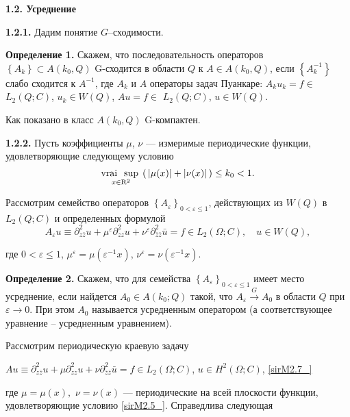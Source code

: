 \textbf{1.2.  Усреднение}

\textbf{1.2.1. }Дадим понятие $G$--сходимости.

\textbf{Определение 1.} Скажем, что  последовательность операторов $\left\{A_{k} \right\}\subset A(k_{0} ,Q)$ G-сходится в области $Q$ к $A\in A(k_{0} ,Q)$, если $\left\{A_{k}^{-1} \right\}$ слабо сходится к $A^{-1} $, где $A_{k} $ и $A$ операторы задач Пуанкаре:  $A_{k} u_{k} =f\in $$L_{2} (Q;C)$, $u_{k} \in W(Q)$, $Au=f\in $ $L_{2} (Q;C)$, $u\in W(Q)$.



Как показано в \cite{JikovKozlov}  класс  $A(k_{0} ,Q)$ G-компактен.

\textbf{1.2.2.} Пусть коэффициенты $\mu $, $\nu $ --- измеримые периодические функции, удовлетворяющие следующему условию
\begin{equation}
\label{sirM2.5_}
\mathop{\mathrm{ vrai}\, {\kern 1pt} \; \sup {\kern 1pt} }\limits_{x\in \mathrm{ R}^{2} } \left(\, \left|\mu (x)\right|+\left|\nu (x)\right|\, \right)\le k_{0} <1.
\end{equation}

Рассмотрим семейство операторов $\left\{A_{\varepsilon } \right\}_{0<\varepsilon \le 1} $, действующих из $W(Q)$ в $L_{2} (Q;C)$ и определенных формулой
\begin{equation}
\label{sirM2.6_}
A_{\varepsilon } u\equiv \partial _{z\bar{z}}^{2} u+\mu ^{\varepsilon } \partial _{zz}^{2} u+\nu ^{\varepsilon } \partial _{\bar{z}\bar{z}}^{2} \bar{u}=f\in L_{2} (\Omega ;C), \quad u\in W(Q),
\end{equation}

где  $0<\varepsilon \le 1$, $\mu ^{\varepsilon } =\mu (\varepsilon ^{-1} x)$, $\nu ^{\varepsilon } =\nu (\varepsilon ^{-1} x)$.

\textbf{Определение 2.} Скажем, что для семейства $\left\{A_{\varepsilon } \right\}_{0<\varepsilon \le 1} $ имеет место усреднение, если найдется $A_{0} \in A(k_{0} ;Q)$ такой, что  $A_{\varepsilon } \stackrel{G}{\longrightarrow} A_{0} $ в области $Q$ при $\varepsilon \to 0$. При этом $A_{0} $ называется усредненным оператором (а соответствующее уравнение -- усредненным уравнением).

Рассмотрим периодическую краевую задачу

         $Au\equiv \partial _{z\bar{z}}^{2} u+\mu \partial _{zz}^{2} u+\nu \partial _{\bar{z}\bar{z}}^{2} \bar{u}=f\in L_{2} (\Omega ;C)$,     $u\in H^{2} (\Omega ;C)$,                \eqref{sirM2.7_}

где $\mu =\mu (x),$ $\nu =\nu (x)$ --- периодические на всей плоскости функции, удовлетворяющие условию \eqref{sirM2.5_}. Справедлива следующая

